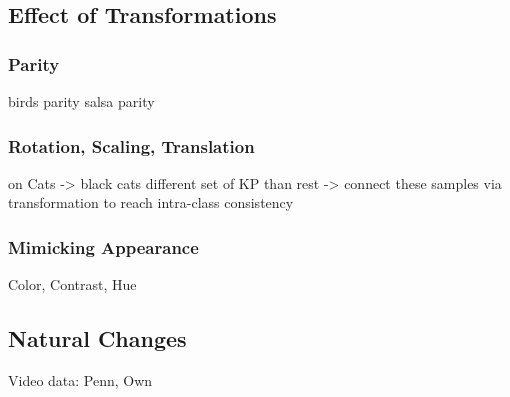 	\subsection{Effect of Transformations}
		\subsubsection{Parity}
		birds parity
		salsa parity
		\subsubsection{Rotation, Scaling, Translation}
			on Cats -> black cats different set of KP than rest -> connect these samples via transformation to reach intra-class consistency
		\subsubsection{Mimicking Appearance}
		Color, Contrast, Hue
		\subsection{Natural Changes}
		Video data: Penn, Own
